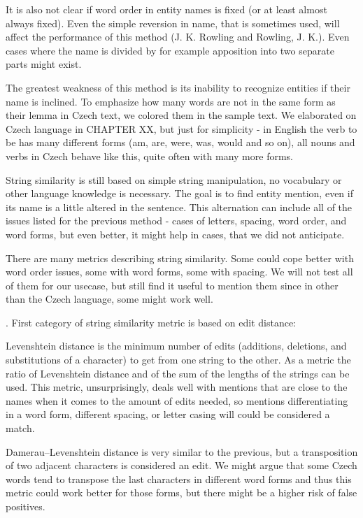 It is also not clear if word order in entity names is fixed (or at least almost always fixed). Even the simple reversion in name, that is sometimes used, will affect the performance of this method (J. K. Rowling and Rowling, J. K.).  Even cases where the name is divided by for example apposition into two separate parts might exist.

The greatest weakness of this method is its inability to recognize entities if their name is inclined. To emphasize how many words are not in the same form as their lemma in Czech text, we colored them in the sample text.  We elaborated on Czech language in  CHAPTER XX, but just for simplicity - in English the verb to be has many different forms (am, are, were, was, would and so on), all nouns and verbs in Czech behave like this, quite often with many more forms.

 String similarity is still based on simple string manipulation, no vocabulary or other language knowledge is necessary. The goal is to find entity mention, even if its name is a little altered in the sentence. This alternation can include all of the issues listed for the previous method - cases of letters, spacing, word order, and word forms, but even better, it might help in cases, that we did not anticipate.

There are many metrics describing string similarity. Some could cope better with word order issues, some with word forms, some with spacing. We will not test all of them for our usecase, but still find it useful to mention them since in other than the Czech language, some might work well.

. First category of string similarity metric is based on edit distance:

Levenshtein distance is the minimum number of edits (additions, deletions, and substitutions of a character) to get from one string to the other. As a metric the ratio of Levenshtein distance and of the sum of the lengths of the strings can be used. This metric, unsurprisingly, deals well with mentions that are close to the names when it comes to the amount of edits needed, so mentions differentiating in a word form, different spacing, or letter casing will could be considered a match.

Damerau–Levenshtein distance is very similar to the previous, but a transposition of two adjacent characters is considered an edit. We might argue that some Czech words tend to transpose the last characters in different word forms and thus this metric could work better for those forms, but there might be a higher risk of false positives.

